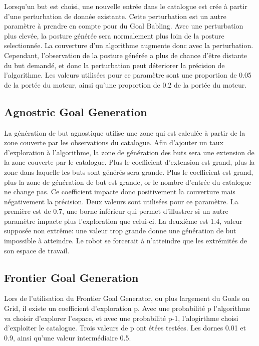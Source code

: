 \documentclass[11pt,french]{report}
\begin{document}
Lorsqu'un but est choisi, une nouvelle entrée dans le catalogue est crée à partir d'une perturbation de donnée existante. Cette perturbation est un autre paramètre à prendre en compte pour du Goal Babling. Avec une perturbation plus elevée, la posture générée sera normalement plus loin de la posture selectionnée. La couverture d'un algorithme augmente donc avec la perturbation. Cependant, l'observation de la posture générée a plus de chance d'être distante du but demandé, et donc la perturbation peut déteriorer la précision de l'algorithme. Les valeurs utilisées pour ce paramètre sont une proportion de 0.05 de la portée du moteur, ainsi qu'une proportion de 0.2 de la portée du moteur.

\subsection{Agnostric Goal Generation}

La génération de but agnostique utilise une zone qui est calculée à partir de la zone couverte par les observations du catalogue. Afin d'ajouter un taux d'exploration à l'algorithme, la zone de génération des buts sera une extension de la zone couverte par le catalogue. Plus le coefficient d'extension est grand, plus la zone dans laquelle les buts sont générés sera grande. Plus le coefficient est grand, plus la zone de génération de but est grande, or le nombre d'entrée du catalogue ne change pas. Ce coefficient impacte donc positivement la couverture mais négativement la précision. Deux valeurs sont utilisées pour ce paramètre. La première est de 0.7, une borne inférieur qui permet d'illustrer si un autre paramètre impacte plus l'exploration que celui-ci. La deuxième est 1.4, valeur supposée non extrême: une valeur trop grande donne une génération de but impossible à atteindre. Le robot se forcerait à n'atteindre que les extrémités de son espace de travail.

\subsection{Frontier Goal Generation}

Lors de l'utilisation du Frontier Goal Generator, ou plus largement du Goals on Grid, il existe un coefficient d'exploration p. Avec une probabilité p l'algorithme va choisir d'explorer l'espace, et avec une probabilité p-1, l'alogirthme choisi d'exploiter le catalogue. Trois valeurs de p ont étées testées. Les dornes 0.01 et 0.9, ainsi qu'une valeur intermédiaire 0.5.
\end{document}
